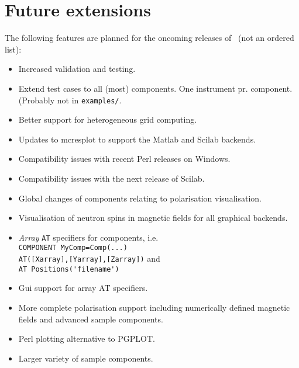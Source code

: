 \section{Future extensions}
\label{s:future}
The following features are planned for the oncoming releases of \MCS\
(not an ordered list):
\begin{itemize}
\item Increased validation and testing.
\item Extend test cases to all (most) components. One instrument
  pr. component. (Probably not in \verb+examples/+.
\item Better support for heterogeneous grid computing.
\item Updates to mcresplot to support the Matlab and Scilab backends.
\item Compatibility issues with recent Perl releases on Windows.
\item Compatibility issues with the next release of Scilab.
\item Global changes of components relating to polarisation
  visualisation.
\item Visualisation of neutron spins in magnetic fields for all
  graphical backends.
\item \emph{Array} \verb+AT+ specifiers for components, i.e. \\
  \verb+COMPONENT MyComp=Comp(...)+\\\verb+AT([Xarray],[Yarray],[Zarray])+ and\\
  \verb+AT Positions('filename')+
\item Gui support for array AT specifiers.
\item More complete polarisation support including numerically defined
  magnetic fields and advanced sample components.
\item Perl plotting alternative to PGPLOT.
\item Larger variety of sample components.
\end{itemize}








